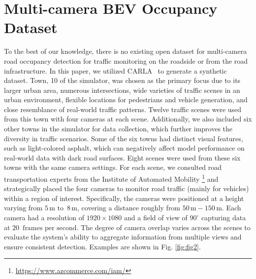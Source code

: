 
\section{Multi-camera BEV Occupancy Dataset}
\label{sec:datagen}

To the best of our knowledge, there is no existing open dataset for multi-camera road occupancy detection for traffic monitoring on the roadside or from the road infrastructure. In this paper, we utilized CARLA~\cite{dosovitskiy2017carla} to generate a synthetic dataset. Town, 10 of the simulator, was chosen as the primary focus due to its larger urban area, numerous intersections, wide varieties of traffic scenes in an urban environment, flexible locations for pedestrians and vehicle generation, and close resemblance of real-world traffic patterns. Twelve traffic scenes were used from this town with four cameras at each scene. Additionally, we also included six other towns in the simulator for data collection, which further improves the diversity in traffic scenarios. Some of the six towns had distinct visual features, such as light-colored asphalt, which can negatively affect model performance on real-world data with dark road surfaces. Eight scenes were used from these six towns with the same camera settings. For each scene, we consulted road transportation experts from the Institute of Automated Mobility \footnote{\url{https://www.azcommerce.com/iam/}} and strategically placed the four cameras to monitor road traffic (mainly for vehicles) within a region of interest. Specifically, the cameras were positioned at a height varying from $5\,\text{m to }\,8\,\text{m}$, covering a distance roughly from $50\,\text{m} - 150\,\text{m}$. Each camera had a resolution of $1920\times1080$ and a field of view of $90^{\circ}$ capturing data at $20\,\text{ frames per second}$. The degree of camera overlap varies across the scenes to evaluate the system's ability to aggregate information from multiple views and ensure consistent detection. Examples are shown in Fig. \ref{fig:fig2}.



